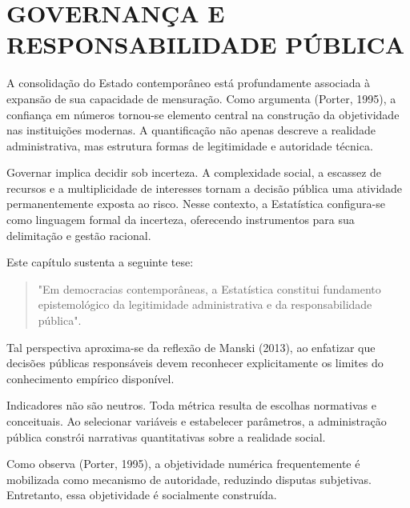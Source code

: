 
\chapter{GOVERNANÇA E RESPONSABILIDADE PÚBLICA}


A consolidação do Estado contemporâneo está profundamente associada à expansão de sua capacidade de mensuração. Como argumenta (Porter, 1995), a confiança em números tornou-se elemento central na construção da objetividade nas instituições modernas. A quantificação não apenas des\-cre\-ve a realidade administrativa, mas estrutura formas de legitimidade e autoridade técnica. \vskip0.3cm

Governar implica decidir sob incerteza. A complexidade social, a escassez de recursos e a multiplicidade de interesses tornam a decisão pública uma atividade permanentemente exposta ao risco. Nesse contexto, a Estatística configura-se como linguagem formal da incerteza, oferecendo instrumentos para sua delimitação e gestão racional.\vskip0.3cm

Este capítulo sustenta a seguinte tese: \vskip0.3cm

\begin{quote}
"Em democracias contemporâneas, a Estatística constitui fundamento epistemológico da legitimidade administrativa e da responsabilidade pública".
\end{quote}

Tal perspectiva aproxima-se da reflexão de Manski (2013), ao enfatizar que decisões públicas responsáveis devem reconhecer explicitamente os limites do conhecimento empírico disponível. \vskip0.3cm


Indicadores não são neutros. Toda métrica resulta de escolhas normativas e conceituais. Ao selecionar variáveis e estabelecer parâmetros, a administração pública constrói narrativas quantitativas sobre a realidade social. \vskip0.3cm

Como observa (Porter, 1995), a objetividade numérica frequentemente é mobilizada como mecanismo de autoridade, reduzindo disputas subjetivas. Entretanto, essa objetividade é socialmente construída. \vskip0.3cm

